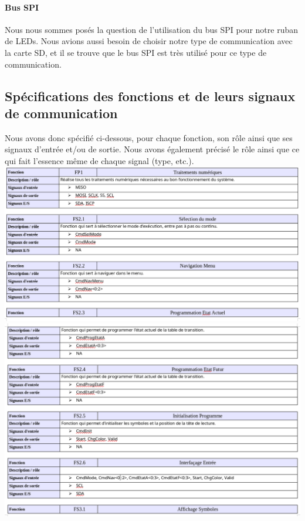 \documentclass[12pt]{report}
\begin{document}
	\paragraph{Bus SPI}
	Nous nous sommes posés la question de l'utilisation du bus SPI pour notre ruban de LEDs. Nous avions aussi besoin de choisir notre type de communication avec la carte SD, et il se trouve que le bus SPI est très utilisé pour ce type de communication.\\
	\subsection{Spécifications des fonctions et de leurs signaux de communication}
	Nous avons donc spécifié ci-dessous, pour chaque fonction, son rôle ainsi que ses signaux d'entrée et/ou de sortie. Nous avons également précisé le rôle ainsi que ce qui fait l'essence même de chaque signal (type, etc.).\\
	\includegraphics[width=\textwidth]{img/f1}
	\includegraphics[width=\textwidth]{img/f2}
\end{document}
